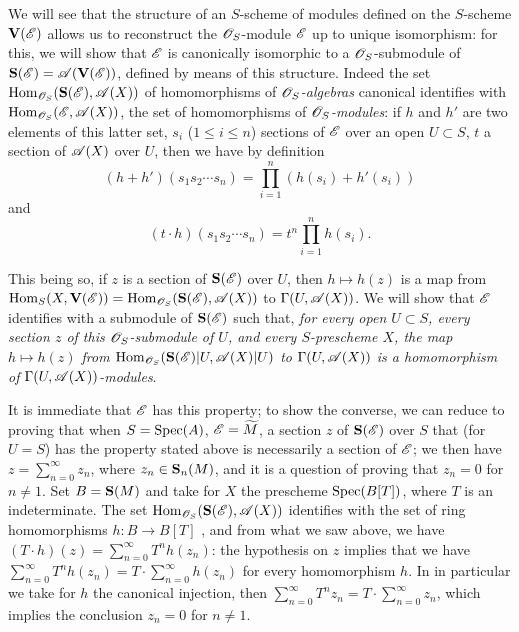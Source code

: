 \begin{env}[1.7.14]
\label{II.1.7.14}
We will see that the structure of an $S$-scheme of modules defined on the $S$-scheme $\mathbf{V}(\mathscr{E})$ allows us to reconstruct the $\mathscr{O}_S$-module $\mathscr{E}$ up to unique isomorphism: for this, we will show that $\mathscr{E}$ is canonically isomorphic to a $\mathscr{O}_S$-submodule of $\mathbf{S}(\mathscr{E})=\mathscr{A}(\mathbf{V}(\mathscr{E}))$, defined by means of this structure.
Indeed  the set $\operatorname{Hom}_{\mathscr{O}_S}(\mathbf{S}(\mathscr{E}),\mathscr{A}(X))$ of homomorphisms of \emph{$\mathscr{O}_S$-algebras} canonical identifies with $\operatorname{Hom}_{\mathscr{O}_S}(\mathscr{E},\mathscr{A}(X))$, the set of homomorphisms of \emph{$\mathscr{O}_S$-modules}: if $h$ and $h'$ are two elements of this latter set, $s_i$ ($1\leq i\leq n$) sections of $\mathscr{E}$ over an open $U\subset S$, $t$ a section of $\mathscr{A}(X)$ over $U$, then we have by definition
\[
  (h+h')(s_1 s_2\cdots s_n)=\prod_{i=1}^n(h(s_i)+h'(s_i))
\]
and
\[
  (t\cdot h)(s_1 s_2\cdots s_n)=t^n\prod_{i=1}^n h(s_i).
\]

This being so, if $z$ is a section of $\mathbf{S}(\mathscr{E})$ over $U$, then $h\mapsto h(z)$ is a map from $\operatorname{Hom}_S(X,\mathbf{V}(\mathscr{E}))=\operatorname{Hom}_{\mathscr{O}_S}(\mathbf{S}(\mathscr{E}),\mathscr{A}(X))$ to $\Gamma(U,\mathscr{A}(X))$.
We will
show that $\mathscr{E}$ identifies with a submodule of $\mathbf{S}(\mathscr{E})$ such that, \emph{for every open $U\subset S$, every section $z$ of this $\mathscr{O}_S$-submodule of $U$, and every $S$-prescheme $X$, the map $h\mapsto h(z)$ from $\operatorname{Hom}_{\mathscr{O}_S}(\mathbf{S}(\mathscr{E})|U,\mathscr{A}(X)|U)$ to $\Gamma(U,\mathscr{A}(X))$ is a homomorphism of $\Gamma(U,\mathscr{A}(X))$-modules}.

It is immediate that $\mathscr{E}$ has this property; to show the converse, we can reduce to proving that when $S=\operatorname{Spec}(A)$, $\mathscr{E}=\widetilde{M}$, a section $z$ of $\mathbf{S}(\mathscr{E})$ over $S$ that (for $U=S$) has the property stated above is necessarily a section of $\mathscr{E}$; we then have $z=\sum_{n=0}^\infty z_n$, where $z_n\in\mathbf{S}_n(M)$, and it is a question of proving that $z_n=0$ for $n\neq 1$.
Set $B=\mathbf{S}(M)$ and take for $X$ the prescheme $\operatorname{Spec}(B[T])$, where $T$ is an indeterminate.
The set $\operatorname{Hom}_{\mathscr{O}_S}(\mathbf{S}(\mathscr{E}),\mathscr{A}(X))$ identifies with the set of ring homomorphisms $h:B\to B[T]$ , and from what we saw above, we have $(T\cdot h)(z)=\sum_{n=0}^\infty T^n h(z_n)$: the hypothesis on $z$ implies that we have $\sum_{n=0}^\infty T^n h(z_n)=T\cdot\sum_{n=0}^\infty h(z_n)$ for every homomorphism $h$.
In in particular we take for $h$ the canonical injection, then $\sum_{n=0}^\infty T^n z_n=T\cdot\sum_{n=0}^\infty z_n$, which implies the conclusion $z_n=0$ for $n\neq 1$.
\end{env}

